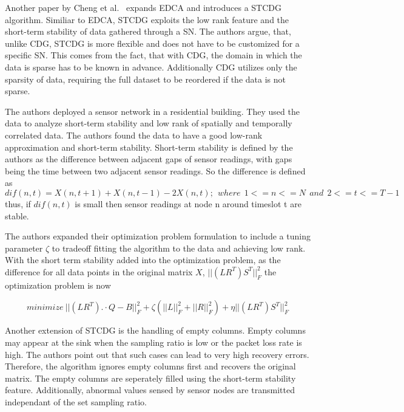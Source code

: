 \par

Another paper by Cheng et al.~\cite{cheng2013stcdg} expands \ac{EDCA} and
introduces a \ac{STCDG} algorithm. Similiar to \ac{EDCA}, \ac{STCDG} exploits
the low rank feature and the short-term stability of data gathered through a
\ac{SN}. The authors argue, that, unlike \ac{CDG}, \ac{STCDG} is more flexible
and does not have to be customized for a specific \ac{SN}. This comes from the
fact, that with \ac{CDG}, the domain in which the data is sparse has to be
known in advance. Additionally \ac{CDG} utilizes only the sparsity of data,
requiring the full dataset to be reordered if the data is not sparse.

The authors deployed a sensor network in a residential building. They used the
data to analyze short-term stability and low rank of spatially and temporally
correlated data. The authors found the data to have a good low-rank
approximation and short-term stability. Short-term stability is defined by the
authors as the difference between adjacent gaps of sensor readings, with gaps
being the time between two adjacent sensor readings. So the difference is
defined as
$$
dif(n,t) = X(n,t + 1) + X(n,t - 1) - 2X(n, t); \ \ where  \ \ 1 <= n <= N  \ \ and  \ \ 2 <= t <= T - 1
$$
thus, if $ dif(n, t) $ is small then sensor readings at node n around timeslot
t are stable.

The authors expanded their optimization problem formulation to include a tuning
parameter $ \zeta $ to tradeoff fitting the algorithm to the data and achieving
low rank. With the short term stability added into the optimization problem, as
the difference for all data points in the original matrix $ X $, $
||(LR^T)S^T||^2_F $ the optimization problem is now

$$
minimize \ ||(LR^T). \cdot Q-B||^2_F + \zeta(||L||^2_F + ||R||^2_F) + \eta ||(LR^T)S^T||^2_F
$$

Another extension of \ac{STCDG} is the handling of empty columns. Empty
columns may appear at the sink when the sampling ratio is low or the packet
loss rate is high. The authors point out that such cases can lead to very high
recovery errors. Therefore, the algorithm ignores empty columns first and
recovers the original matrix. The empty columns are seperately filled using the
short-term stability feature. Additionally, abnormal values sensed by sensor
nodes are transmitted independant of the set sampling ratio.

